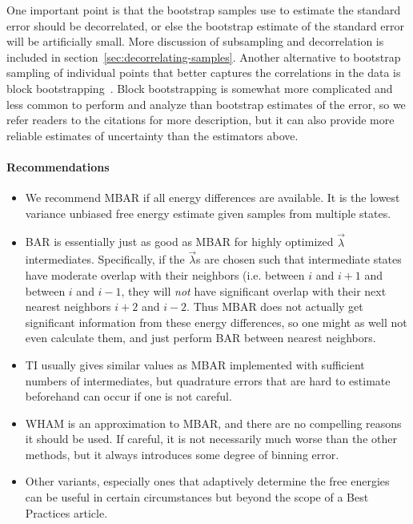 \documentclass[9pt,bestpractices]{livecoms}
\begin{document}
One important point is that the bootstrap samples use to estimate the standard error should be decorrelated, or else the bootstrap estimate of the standard error will be artificially small.  More discussion of subsampling and decorrelation is included in section~\ref{sec:decorrelating-samples}. Another alternative to bootstrap sampling of individual points that better captures the correlations in the data is block bootstrapping~\cite{???}.  Block bootstrapping is somewhat more complicated and less common to perform and analyze than bootstrap estimates of the error, so we refer readers to the citations for more description, but it can also provide more reliable estimates of uncertainty than the estimators above.


\paragraph{Recommendations}
\begin{itemize}
\item We recommend MBAR if all energy differences are available. It is the lowest variance unbiased free energy estimate given samples from multiple states.
\item BAR is essentially just as good as MBAR for highly optimized $\vec{\lambda}$ intermediates. Specifically, if the $\vec{\lambda}$s are chosen such that intermediate states have moderate overlap with their neighbors (i.e. between $i$ and $i+1$ and between $i$ and $i-1$, they will \textit{not} have significant overlap with their next nearest neighbors $i+2$ and $i-2$. Thus MBAR does not actually get significant information from these energy differences, so one might as well not even calculate them, and just perform BAR between nearest neighbors.~\cite{paliwal2011benchmark} 
\item TI usually gives similar values as MBAR implemented with sufficient numbers of intermediates, but quadrature errors that are hard to estimate beforehand  can occur if one is not careful.~\cite{paliwal2011benchmark}
\item WHAM is an approximation to MBAR, and there are no compelling reasons it should be used. If careful, it is not necessarily much worse than the other methods, but it always introduces some degree of binning error.
\item Other variants, especially ones that adaptively determine the free energies can be useful in certain circumstances but beyond the scope of a Best Practices article.
\end{itemize}
\end{document}
